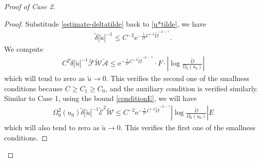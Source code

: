 \documentclass[11pt,reqno]{amsart}
\theoremstyle{definition}
\numberwithin{equation}{section}
\newcommand{\tdelta}{\widetilde{\delta}}
\newcommand{\tOmega}{\widetilde{\Omega}}
\newcommand{\tu}{\widetilde{u}}
\begin{document}
\begin{proof}[Proof of Case 2]
\begin{proof}
Substitude \eqref{estimate-deltatilde} back to \eqref{u*tilde}, we have
\begin{align}\label{estimate-deltau-1tilde}
\tdelta|\tu|^{-1}\le C^{-2}\mathrm{e}^{-\frac{1}{17}C^{-2}\widetilde{\Omega}^{-2-\gamma}}.
\end{align}
We compute
 \begin{align*}
C^2\tdelta|\tu|^{-1}\widetilde{\mathscr{F}}\widetilde{\mathscr{W}}\widetilde{\mathcal{A}}\le \mathrm{e}^{-\frac{1}{17}C^{-2}\widetilde{\Omega}^{-2-\gamma}}\cdot F\cdot\left|\log\frac{\tOmega}{\Omega_0(u_0)}\right|
\end{align*}
which will tend to zero as $\tu\to0$. This verifies the second one of the smallness conditions because $C\ge C_1\ge C_0$, and the auxiliary condition is verified similarly. Similar to Case 1, using the bound \eqref{conditionE}, we will have
\begin{align*}
\Omega_0^2(u_0)\tdelta|\tu|^{-1}\widetilde{\mathscr{E}}^2\widetilde{\mathscr{W}}\le C^{-2}\mathrm{e}^{-\frac{1}{17}C^{-2}\widetilde{\Omega}^{-2-\gamma}}\left|\log\frac{\tOmega}{\Omega_0(u_0)}\right|E
\end{align*}
which will also tend to zero as $\tu\to0$. This verifies the first one of the smallness conditions.


\end{proof}
\end{proof}
\end{document}
